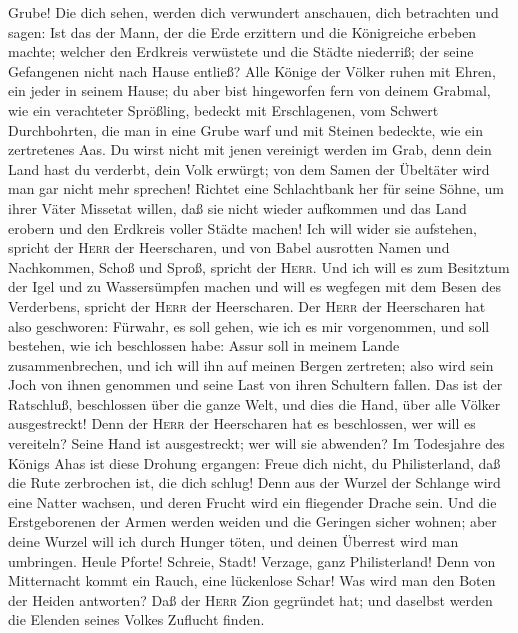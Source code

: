 Grube!  Die dich sehen, werden dich verwundert anschauen,
dich betrachten und sagen: Ist das der Mann, der die Erde erzittern und
die Königreiche erbeben machte;  welcher den Erdkreis
verwüstete und die Städte niederriß; der seine Gefangenen nicht nach
Hause entließ?  Alle Könige der Völker ruhen mit Ehren,
ein jeder in seinem Hause;  du aber bist hingeworfen fern
von deinem Grabmal, wie ein verachteter Sprößling, bedeckt mit
Erschlagenen, vom Schwert Durchbohrten, die man in eine Grube warf und
mit Steinen bedeckte, wie ein zertretenes Aas.  Du wirst
nicht mit jenen vereinigt werden im Grab, denn dein Land hast du
verderbt, dein Volk erwürgt; von dem Samen der Übeltäter wird man gar
nicht mehr sprechen!  Richtet eine Schlachtbank her für
seine Söhne, um ihrer Väter Missetat willen, daß sie nicht wieder
aufkommen und das Land erobern und den Erdkreis voller Städte machen!
 Ich will wider sie aufstehen, spricht der \textsc{Herr}
der Heerscharen, und von Babel ausrotten Namen und Nachkommen, Schoß und
Sproß, spricht der \textsc{Herr}.  Und ich will es zum
Besitztum der Igel und zu Wassersümpfen machen und will es wegfegen mit
dem Besen des Verderbens, spricht der \textsc{Herr} der Heerscharen.
 Der \textsc{Herr} der Heerscharen hat also geschworen:
Fürwahr, es soll gehen, wie ich es mir vorgenommen, und soll bestehen,
wie ich beschlossen habe:  Assur soll in meinem Lande
zusammenbrechen, und ich will ihn auf meinen Bergen zertreten; also wird
sein Joch von ihnen genommen und seine Last von ihren Schultern fallen.
 Das ist der Ratschluß, beschlossen über die ganze Welt,
und dies die Hand, über alle Völker ausgestreckt!  Denn
der \textsc{Herr} der Heerscharen hat es beschlossen, wer will es
vereiteln? Seine Hand ist ausgestreckt; wer will sie abwenden?
 Im Todesjahre des Königs Ahas ist diese Drohung
ergangen:  Freue dich nicht, du Philisterland, daß die
Rute zerbrochen ist, die dich schlug! Denn aus der Wurzel der Schlange
wird eine Natter wachsen, und deren Frucht wird ein fliegender Drache
sein.  Und die Erstgeborenen der Armen werden weiden und
die Geringen sicher wohnen; aber deine Wurzel will ich durch Hunger
töten, und deinen Überrest wird man umbringen.  Heule
Pforte! Schreie, Stadt! Verzage, ganz Philisterland! Denn von
Mitternacht kommt ein Rauch, eine lückenlose Schar!  Was
wird man den Boten der Heiden antworten? Daß der \textsc{Herr} Zion
gegründet hat; und daselbst werden die Elenden seines Volkes Zuflucht
finden.

